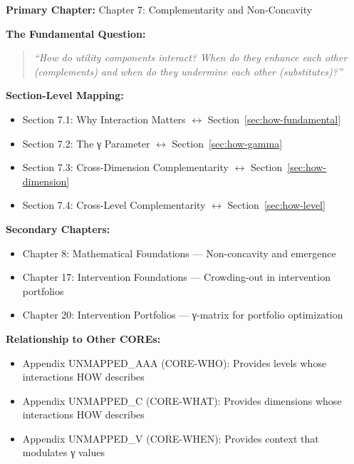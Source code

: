 \begin{tcolorbox}[colback=purple!5!white, colframe=purple!75!black,
    title=Chapter Linkage]

\textbf{Primary Chapter:} Chapter 7: Complementarity and Non-Concavity

\vspace{0.3em}
\textbf{The Fundamental Question:}
\begin{quote}
\textit{``How do utility components interact? When do they enhance each other (complements) and when do they undermine each other (substitutes)?''}
\end{quote}

\textbf{Section-Level Mapping:}
\begin{itemize}[nosep]
\item Section 7.1: Why Interaction Matters $\leftrightarrow$ Section~\ref{sec:how-fundamental}
\item Section 7.2: The γ Parameter $\leftrightarrow$ Section~\ref{sec:how-gamma}
\item Section 7.3: Cross-Dimension Complementarity $\leftrightarrow$ Section~\ref{sec:how-dimension}
\item Section 7.4: Cross-Level Complementarity $\leftrightarrow$ Section~\ref{sec:how-level}
\end{itemize}

\textbf{Secondary Chapters:}
\begin{itemize}[nosep]
\item Chapter 8: Mathematical Foundations --- Non-concavity and emergence
\item Chapter 17: Intervention Foundations --- Crowding-out in intervention portfolios
\item Chapter 20: Intervention Portfolios --- γ-matrix for portfolio optimization
\end{itemize}

\textbf{Relationship to Other COREs:}
\begin{itemize}[nosep]
\item Appendix UNMAPPED_AAA (CORE-WHO): Provides levels whose interactions HOW describes
\item Appendix UNMAPPED_C (CORE-WHAT): Provides dimensions whose interactions HOW describes
\item Appendix UNMAPPED_V (CORE-WHEN): Provides context that modulates γ values
\end{itemize}

\end{tcolorbox}

